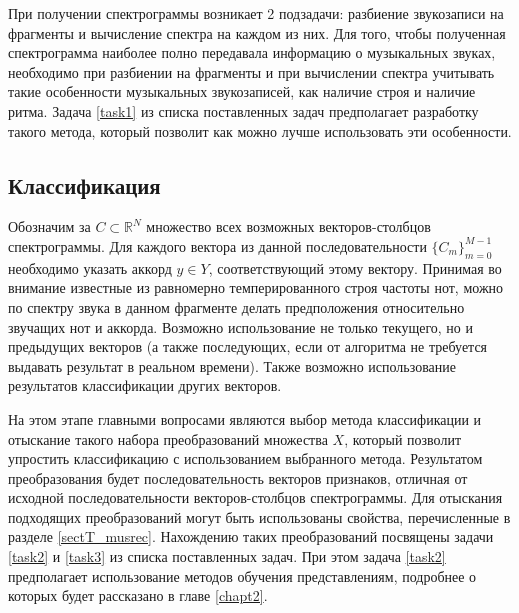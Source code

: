 При получении спектрограммы возникает 2 подзадачи: разбиение звукозаписи на
фрагменты и вычисление спектра на каждом из них. Для того, чтобы полученная
спектрограмма наиболее полно передавала информацию о музыкальных звуках,
необходимо при разбиении на фрагменты и при вычислении спектра учитывать
такие особенности музыкальных звукозаписей, как наличие строя и наличие ритма.
Задача \ref{task1} из списка поставленных задач предполагает разработку такого
метода, который позволит как можно лучше использовать эти особенности.


\subsection{Классификация}

Обозначим за $C \subset \mathbb{R}^N$ множество всех возможных векторов-столбцов
спектрограммы. Для каждого вектора из данной последовательности
$\{C_m\}_{m=0}^{M-1}$ необходимо указать аккорд $y \in Y$, соответствующий
этому вектору. Принимая во внимание известные из равномерно темперированного
строя частоты нот, можно по спектру звука в данном фрагменте делать
предположения относительно звучащих нот и аккорда. Возможно использование не
только текущего, но и предыдущих векторов (а также последующих, если от алгоритма не
требуется выдавать результат в реальном времени). Также возможно использование
результатов классификации других векторов.

На этом этапе главными вопросами являются выбор метода классификации и отыскание
такого набора преобразований множества $X$, который позволит упростить
классификацию с использованием выбранного метода. Результатом преобразования
будет последовательность векторов признаков, отличная от исходной
последовательности векторов-столбцов спектрограммы. Для отыскания подходящих
преобразований могут быть использованы свойства, перечисленные в разделе
\ref{sectT_musrec}. Нахождению таких преобразований посвящены задачи \ref{task2}
и \ref{task3} из списка поставленных задач. При этом задача \ref{task2}
предполагает использование методов обучения представлениям, подробнее о которых
будет рассказано в главе \ref{chapt2}.

